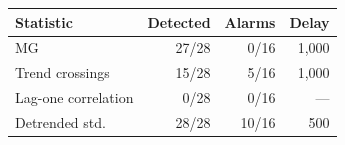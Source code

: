 \begin{tabular}{lrrr}
\toprule
Statistic & Detected & Alarms & Delay \\
\midrule
MG & 27/28 & 0/16 & 1,000 \\
Trend crossings & 15/28 & 5/16 & 1,000 \\
Lag-one correlation & 0/28 & 0/16 & --- \\
Detrended std. & 28/28 & 10/16 & 500 \\
\bottomrule
\end{tabular}

